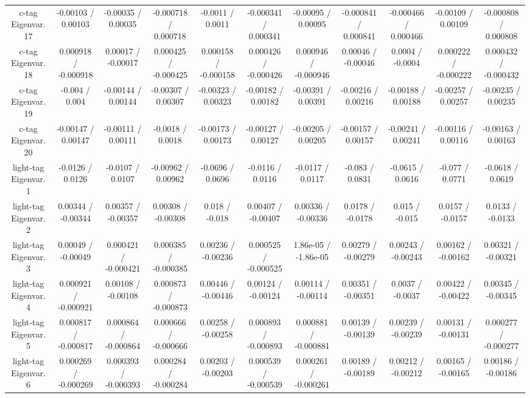 \begin{table}[htbp]
\begin{center}
\begin{tabular}{|c|c|c|c|c|c|c|c|c|c|c|}
  c-tag Eigenvar. 17 & -0.00103 / 0.00103 & -0.00035 / 0.00035 & -0.000718 / 0.000718 & -0.0011 / 0.0011 & -0.000341 / 0.000341 & -0.00095 / 0.00095 & -0.000841 / 0.000841 & -0.000466 / 0.000466 & -0.00109 / 0.00109 & -0.000808 / 0.000808 \\ 
  c-tag Eigenvar. 18 & 0.000918 / -0.000918 & 0.00017 / -0.00017 & 0.000425 / -0.000425 & 0.000158 / -0.000158 & 0.000426 / -0.000426 & 0.000946 / -0.000946 & 0.00046 / -0.00046 & 0.0004 / -0.0004 & 0.000222 / -0.000222 & 0.000432 / -0.000432 \\ 
  c-tag Eigenvar. 19 & -0.004 / 0.004 & -0.00144 / 0.00144 & -0.00307 / 0.00307 & -0.00323 / 0.00323 & -0.00182 / 0.00182 & -0.00391 / 0.00391 & -0.00216 / 0.00216 & -0.00188 / 0.00188 & -0.00257 / 0.00257 & -0.00235 / 0.00235 \\ 
  c-tag Eigenvar. 20 & -0.00147 / 0.00147 & -0.00111 / 0.00111 & -0.0018 / 0.0018 & -0.00173 / 0.00173 & -0.00127 / 0.00127 & -0.00205 / 0.00205 & -0.00157 / 0.00157 & -0.00241 / 0.00241 & -0.00116 / 0.00116 & -0.00163 / 0.00163 \\ 
  light-tag Eigenvar. 1 & -0.0126 / 0.0126 & -0.0107 / 0.0107 & -0.00962 / 0.00962 & -0.0696 / 0.0696 & -0.0116 / 0.0116 & -0.0117 / 0.0117 & -0.083 / 0.0831 & -0.0615 / 0.0616 & -0.077 / 0.0771 & -0.0618 / 0.0619 \\ 
  light-tag Eigenvar. 2 & 0.00344 / -0.00344 & 0.00357 / -0.00357 & 0.00308 / -0.00308 & 0.018 / -0.018 & 0.00407 / -0.00407 & 0.00336 / -0.00336 & 0.0178 / -0.0178 & 0.015 / -0.015 & 0.0157 / -0.0157 & 0.0133 / -0.0133 \\ 
  light-tag Eigenvar. 3 & 0.00049 / -0.00049 & 0.000421 / -0.000421 & 0.000385 / -0.000385 & 0.00236 / -0.00236 & 0.000525 / -0.000525 & 1.86e-05 / -1.86e-05 & 0.00279 / -0.00279 & 0.00243 / -0.00243 & 0.00162 / -0.00162 & 0.00321 / -0.00321 \\ 
  light-tag Eigenvar. 4 & 0.000921 / -0.000921 & 0.00108 / -0.00108 & 0.000873 / -0.000873 & 0.00446 / -0.00446 & 0.00124 / -0.00124 & 0.00114 / -0.00114 & 0.00351 / -0.00351 & 0.0037 / -0.0037 & 0.00422 / -0.00422 & 0.00345 / -0.00345 \\ 
  light-tag Eigenvar. 5 & 0.000817 / -0.000817 & 0.000864 / -0.000864 & 0.000666 / -0.000666 & 0.00258 / -0.00258 & 0.000893 / -0.000893 & 0.000881 / -0.000881 & 0.00139 / -0.00139 & 0.00239 / -0.00239 & 0.00131 / -0.00131 & 0.000277 / -0.000277 \\ 
  light-tag Eigenvar. 6 & 0.000269 / -0.000269 & 0.000393 / -0.000393 & 0.000284 / -0.000284 & 0.00203 / -0.00203 & 0.000539 / -0.000539 & 0.000261 / -0.000261 & 0.00189 / -0.00189 & 0.00212 / -0.00212 & 0.00165 / -0.00165 & 0.00186 / -0.00186 \\ 

\end{tabular}
\end{center}
\end{table}
